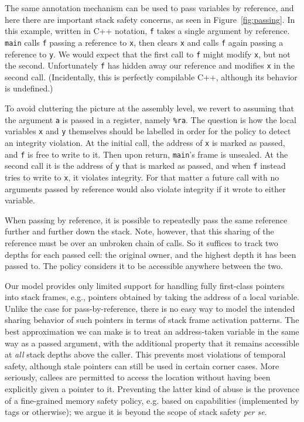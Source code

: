 \documentclass[acmsmall,review,anonymous]{acmart}\settopmatter{printfolios=true,printccs=false,printacmref=false}
\begin{document}
The same annotation mechanism can be used to pass
variables by reference, and here there are important stack safety concerns,
as seen in Figure~\ref{fig:passing}. In this example, written in C++ notation,
{\tt f} takes a single argument by reference.
{\tt main} calls {\tt f} passing a reference to {\tt x}, then clears {\tt x} and calls
{\tt f} again passing a reference to {\tt y}.
We would expect that the first call to {\tt f} might modify
{\tt x}, but not the second. Unfortunately {\tt f} has hidden away our reference and modifies
{\tt x} in the second call. (Incidentally, this is perfectly compilable C++, although its behavior is undefined.)

To avoid cluttering the picture at the assembly level, we revert to assuming that the
argument {\tt a} is passed in a register, namely {\tt \%ra}.
The question is how the local variables {\tt x} and {\tt y} themselves
should be labelled in order for the policy to detect an integrity violation.
At the initial call, the address of {\tt x} is marked as passed, and {\tt f} is free to write to it. Then upon
return, {\tt main}'s frame is unsealed. At the second call it is the address of {\tt y} that is marked as passed,
and when {\tt f} instead tries to write to {\tt x}, it violates integrity. For that matter
a future call with no arguments passed by reference would also violate integrity if it wrote
to either variable.

When passing by reference, it is possible to repeatedly pass the same reference further
and further down the stack. Note, however, that this sharing of the reference must be over
an unbroken chain of calls. So it suffices to track two depths for each passed
cell: the original owner, and the highest depth it has been passed to. The policy considers
it to be accessible anywhere between the two.

Our model provides only limited support for handling fully first-class pointers into
stack frames, e.g., pointers obtained by taking the address of a local variable.
Unlike the case for pass-by-reference, there is no easy way to model the intended
sharing behavior of such pointers in terms of stack frame activation patterns.
The best approximation we can make is to treat an address-taken variable in the
same way as a passed argument, with the additional property
that it remains accessible at \emph{all} stack depths above the caller.
This prevents most violations of temporal safety, although stale pointers can still be
used in certain corner cases.
More seriously, callees are permitted to access the location without having
been explicitly given a pointer to it.  Preventing the latter kind of abuse
is the provence of a fine-grained memory safety policy, e.g. based on capabilities
(implemented by tags or otherwise); we argue it is beyond the scope of stack safety
\emph{per se}.
\end{document}
